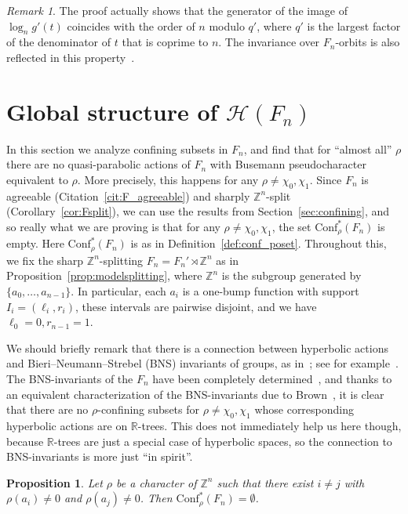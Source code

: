 \documentclass[10pt,a4paper]{article}
\newtheorem{prop}[cdrthm]{Proposition}
\theoremstyle{definition}
\theoremstyle{remark}
\newtheorem{rema}[cdrthm]{Remark}
\newcommand{\Z}{\mathbb{Z}}
\newcommand{\R}{\mathbb{R}}
\newcommand{\Hyp}{\mathcal{H}}
\newcommand{\Conf}{\mathrm{Conf}}
\theoremstyle{plain}
\begin{document}
\begin{rema}
The proof actually shows that the generator of the image of $\log_n g'(t)$ coincides with the order of $n$ modulo $q'$, where $q'$ is the largest factor of the denominator of $t$ that is coprime to $n$. The invariance over $F_n$-orbits is also reflected in this property~\cite{hydelodha}.
\end{rema}

\section{Global structure of \texorpdfstring{$\Hyp(F_n)$}{Hyp(Fn)}}\label{sec:global}

In this section we analyze confining subsets in $F_n$, and find that for ``almost all'' $\rho$ there are no quasi-parabolic actions of $F_n$ with Busemann pseudocharacter equivalent to $\rho$. More precisely, this happens for any $\rho\ne \chi_0,\chi_1$. Since $F_n$ is agreeable (Citation~\ref{cit:F_agreeable}) and sharply $\Z^n$-split (Corollary~\ref{cor:Fsplit}), we can use the results from Section~\ref{sec:confining}, and so really what we are proving is that for any $\rho\ne \chi_0,\chi_1$, the set $\Conf^\ast_\rho(F_n)$ is empty. Here $\Conf^\ast_\rho(F_n)$ is as in Definition~\ref{def:conf_poset}. Throughout this, we fix the sharp $\Z^n$-splitting $F_n = F_n' \rtimes \mathbb{Z}^n$ as in Proposition~\ref{prop:modelsplitting}, where $\Z^n$ is the subgroup generated by $\{a_0,\dots,a_{n-1}\}$. In particular, each $a_i$ is a one-bump function with support $I_i = (\ell_i, r_i)$, these intervals are pairwise disjoint, and we have $\ell_0 = 0, r_{n-1} = 1$.

We should briefly remark that there is a connection between hyperbolic actions and Bieri--Neumann--Strebel (BNS) invariants of groups, as in~\cite{bieri87}; see for example~\cite[Subsection~4.3]{confining}. The BNS-invariants of the $F_n$ have been completely determined~\cite[Theorem~8.1]{bieri87}, and thanks to an equivalent characterization of the BNS-invariants due to Brown~\cite[Corollary~7.4]{brown87trees}, it is clear that there are no $\rho$-confining subsets for $\rho \neq \chi_0, \chi_1$ whose corresponding hyperbolic actions are on $\R$-trees. This does not immediately help us here though, because $\R$-trees are just a special case of hyperbolic spaces, so the connection to BNS-invariants is more just ``in spirit''.

\begin{prop}\label{prop:usually_empty_conf}
Let $\rho$ be a character of $\Z^n$ such that there exist $i\ne j$ with $\rho(a_i)\ne 0$ and $\rho(a_j)\ne 0$. Then $\Conf^\ast_\rho(F_n)=\emptyset$.
\end{prop}
\end{document}

